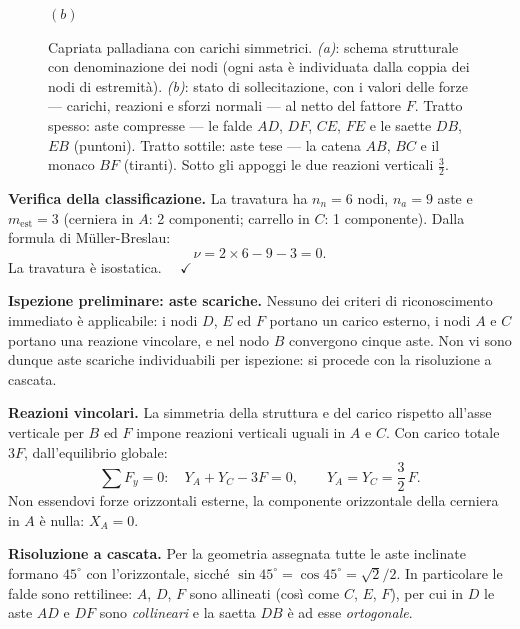 \begin{esempio}
\begin{svolgimento}
\begin{figure}[htbp]
\begin{minipage}[t]{0.48\textwidth}
				\par\smallskip$(b)$
			\end{minipage}
			\caption{Capriata palladiana con carichi simmetrici.
				\emph{(a)}: schema strutturale con denominazione dei nodi
				(ogni asta è individuata dalla coppia dei nodi di estremità).
				\emph{(b)}: stato di sollecitazione, con i valori delle forze
				--- carichi, reazioni e sforzi normali --- al netto del fattore $F$.
				Tratto spesso: aste compresse --- le falde $AD$,
				$DF$, $CE$, $FE$ e le saette $DB$, $EB$ (puntoni).
				Tratto sottile: aste tese --- la catena $AB$, $BC$
				e il monaco $BF$ (tiranti). Sotto gli appoggi le due
				reazioni verticali $\tfrac{3}{2}$.}
			\label{fig:capriata_palladiana}
		\end{figure}
		
		\noindent\textbf{Verifica della classificazione.}
		La travatura ha $n_n = 6$ nodi, $n_a = 9$ aste e
		$m_\text{est} = 3$ (cerniera in $A$: 2 componenti;
		carrello in $C$: 1 componente). Dalla formula di
		M\"{u}ller-Breslau:
		\[
		\nu = 2 \times 6 - 9 - 3 = 0.
		\]
		La travatura è isostatica. $\quad\checkmark$
		
		\noindent\textbf{Ispezione preliminare: aste scariche.}
		Nessuno dei criteri di riconoscimento immediato è
		applicabile: i nodi $D$, $E$ ed $F$ portano un carico
		esterno, i nodi $A$ e $C$ portano una reazione
		vincolare, e nel nodo $B$ convergono cinque aste.
		Non vi sono dunque aste scariche individuabili per
		ispezione: si procede con la risoluzione a cascata.
		
		\noindent\textbf{Reazioni vincolari.}
		La simmetria della struttura e del carico rispetto
		all'asse verticale per $B$ ed $F$ impone reazioni
		verticali uguali in $A$ e $C$. Con carico totale
		$3F$, dall'equilibrio globale:
		\[
		\sum F_y = 0:\quad
		Y_A + Y_C - 3F = 0,
		\qquad
		Y_A = Y_C = \frac{3}{2}\,F.
		\]
		Non essendovi forze orizzontali esterne, la
		componente orizzontale della cerniera in $A$ è nulla:
		$X_A = 0$.
		
		\noindent\textbf{Risoluzione a cascata.}
		Per la geometria assegnata tutte le aste inclinate
		formano $45^\circ$ con l'orizzontale, sicché
		$\sin 45^\circ = \cos 45^\circ = \sqrt2/2$. In
		particolare le falde sono rettilinee: $A$, $D$, $F$
		sono allineati (così come $C$, $E$, $F$), per cui in
		$D$ le aste $AD$ e $DF$ sono \emph{collineari} e la
		saetta $DB$ è ad esse \emph{ortogonale}.
		

\end{svolgimento}
\end{esempio}
